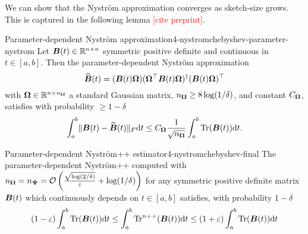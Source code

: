 We can show that the Nystr\"om approximation converges as \gls{sketch-size} grows.
This is captured in the following lemma \textcolor{red}{[cite preprint]}.

\begin{lemma}{Parameter-dependent Nystr\"om approximation}{4-nystromchebyshev-parameter-nystrom}
    Let $\boldsymbol{B}(t) \in \mathbb{R}^{n \times n}$ symmetric positive definite and continuous in $t \in [a, b]$. Then the parameter-dependent Nystr\"om approximation
    \begin{equation}
        \widehat{\boldsymbol{B}}(t) = (\boldsymbol{B}(t) \boldsymbol{\Omega}) (\boldsymbol{\Omega}^{\top} \boldsymbol{B}(t) \boldsymbol{\Omega})^{\dagger} (\boldsymbol{B}(t) \boldsymbol{\Omega})^{\top}
    \end{equation}
    with $\boldsymbol{\Omega} \in \mathbb{R}^{n \times n_{\boldsymbol{\Omega}}}$ a standard Gaussian matrix, $n_{\boldsymbol{\Omega}} \geq 8 \log(1/\delta)$, and constant $C_{\boldsymbol{\Omega}}$, satisfies with probability $\geq 1 - \delta$
    \begin{equation}
        \int_{a}^{b} \lVert \boldsymbol{B}(t) - \widehat{\boldsymbol{B}}(t) \rVert _F \mathrm{d}t \leq C_{\boldsymbol{\Omega}} \frac{1}{\sqrt{n_{\boldsymbol{\Omega}}}} \int_{a}^{b} \operatorname{Tr}(\boldsymbol{B}(t)) \mathrm{d}t.
    \end{equation}
\end{lemma}

\begin{theorem}{Parameter-dependent Nystr\"om++ estimator}{4-nystromchebyshev-final}
    The parameter-dependent Nystr\"om++ computed with
    $n_{\boldsymbol{\Omega}} = n_{\boldsymbol{\Psi}} = \mathcal{O}\left( \frac{\sqrt{\log(2/\delta)}}{\varepsilon} + \log(1/\delta) \right)$
    for any symmetric positive definite matrix $\boldsymbol{B}(t)$ which continuously
    depends on $t \in [a, b]$ satisfies, with probability
    $1 - \delta$
    \begin{equation}
        (1 - \varepsilon) \int_{a}^{b}\operatorname{Tr}(\boldsymbol{B}(t)) \mathrm{d}t \leq \int_{a}^{b}\operatorname{Tr}^{n++}(\boldsymbol{B}(t)) \mathrm{d}t \leq  (1 + \varepsilon) \int_{a}^{b}\operatorname{Tr}(\boldsymbol{B}(t)) \mathrm{d}t
    \end{equation}
\end{theorem}


